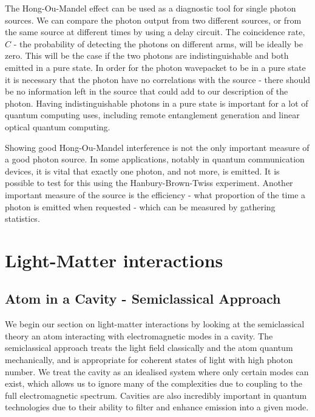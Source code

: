 The Hong-Ou-Mandel effect can be used as a diagnostic tool for single photon sources. We can compare the photon output from two different sources, or from the same source at different times by using a delay circuit. The coincidence rate, $C$ - the probability of detecting the photons on different arms, will be ideally be zero. This will be the case if the two photons are indistinguishable and both emitted in a pure state. In order for the photon wavepacket to be in a pure state it is necessary that the photon have no correlations with the source - there should be no information left in the source that could add to our description of the photon. Having indistinguishable photons in a pure state is important for a lot of quantum computing uses, including remote entanglement generation and linear optical quantum computing. 

Showing good Hong-Ou-Mandel interference is not the only important measure of a good photon source. In some applications, notably in quantum communication devices, it is vital that exactly one photon, and not more, is emitted. It is possible to test for this using the Hanbury-Brown-Twiss experiment. Another important measure of the source is the efficiency - what proportion of the time a photon is emitted when requested - which can be measured by gathering statistics.


\section{Light-Matter interactions}

\subsection{Atom in a Cavity - Semiclassical Approach}

We begin our section on light-matter interactions by looking at the semiclassical theory an atom interacting with electromagnetic modes in a cavity. The semiclassical approach treats the light field classically and the atom quantum mechanically, and is appropriate for coherent states of light with high photon number. We treat the cavity as an idealised system where only certain modes can exist, which allows us to ignore many of the complexities due to coupling to the full electromagnetic spectrum. Cavities are also incredibly important in quantum technologies due to their ability to filter and enhance emission into a given mode.

